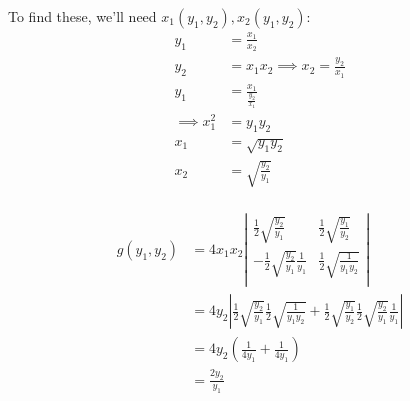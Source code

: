 To find these, we'll need $x_1(y_1, y_2), x_2(y_1, y_2)$:
\begin{align*}
    y_1 &= \frac{x_1}{x_2} \\
    y_2 &= x_1x_2 \implies x_2 = \frac{y_2}{x_1}\\
    y_1 &= \frac{x_1}{\frac{y_2}{x_1}} \\
    \implies x_1^2 &= y_1y_2 \\
    x_1 &= \sqrt{y_1y_2} \\
    x_2 &= \sqrt{\frac{y_2}{y_1}} \\
\end{align*}

\begin{align*}
    g(y_1, y_2) &= 4x_1x_2 \left|\begin{matrix}
        \frac{1}{2}\sqrt{\frac{y_2}{y_1}} & \frac{1}{2}\sqrt{\frac{y_1}{y_2}} \\
        -\frac{1}{2}\sqrt{\frac{y_2}{y_1}}\frac{1}{y_1} & \frac{1}{2}\sqrt{\frac{1}{y_1y_2}} \\
    \end{matrix}\right| \\
    &= 4y_2 \left|
        \frac{1}{2}\sqrt{\frac{y_2}{y_1}}
        \frac{1}{2}\sqrt{\frac{1}{y_1y_2}} + 
        \frac{1}{2}\sqrt{\frac{y_1}{y_2}} 
        \frac{1}{2}\sqrt{\frac{y_2}{y_1}}\frac{1}{y_1}
    \right| \\
    &= 4y_2 \left(
        \frac{1}{4y_1} + 
        \frac{1}{4y_1}
    \right) \\
    &= \frac{2y_2}{y_1} \\
\end{align*}
